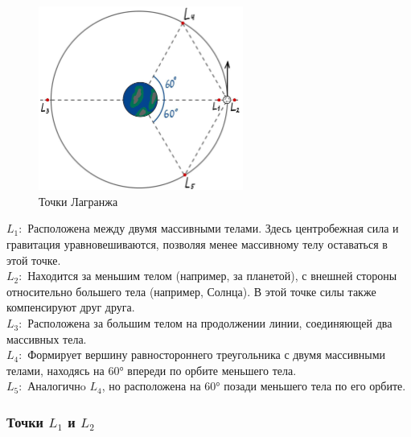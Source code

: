 \documentclass[a4paper,12pt]{article}
\begin{document}
\begin{figure}[H]
    \begin{center}
        \includegraphics[width=0.6\textwidth]{lagrange.jpg}
        \caption{Точки Лагранжа}
    \end{center}
\end{figure} 
\textit{$L_1:$} Расположена между двумя массивными телами.
Здесь центробежная сила и гравитация уравновешиваются, позволяя менее массивному телу оставаться в этой точке.  \\

\textit{$L_2:$} Находится за меньшим телом (например, за планетой), с внешней стороны относительно большего тела (например, Солнца).
В этой точке силы также компенсируют друг друга. \\

\textit{$L_3:$} Расположена за большим телом на продолжении линии, соединяющей два массивных тела. \\

\textit{$L_4:$} Формирует вершину равностороннего треугольника с двумя массивными телами, находясь на 60° впереди по орбите меньшего тела. \\

\textit{$L_5:$} Аналогичнo $L_4$, но расположена на 60° позади меньшего тела по его орбите. \\

\subsubsection{Точки $L_1$ и $L_2$}
\end{document}
